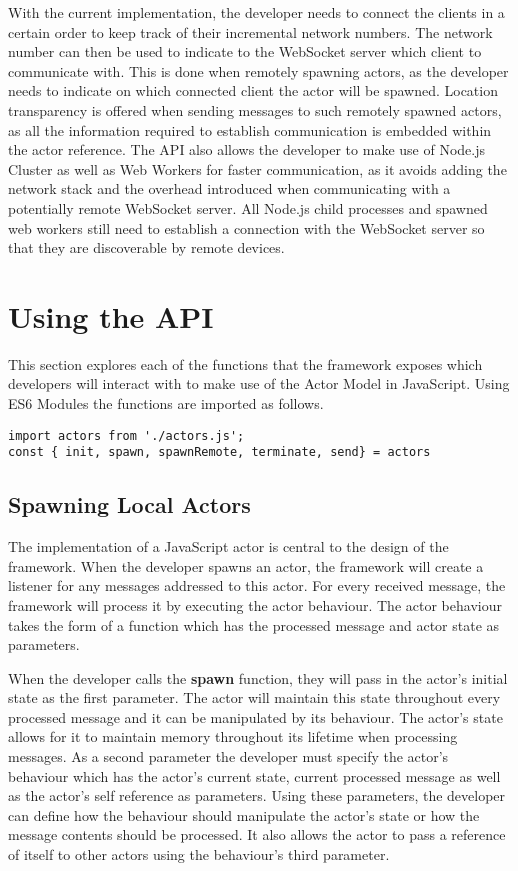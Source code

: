 \documentclass[12pt, a4paper]{report}
\theoremstyle{definition}
\theoremstyle{definition}%
\theoremstyle{definition}%
\theoremstyle{definition}%
\theoremstyle{definition}%
\theoremstyle{definition}%
\begin{document}
With the current implementation, the developer needs to connect the clients in a certain order to keep track of their incremental network numbers. The network number can then be used to indicate to the WebSocket server which client to communicate with. This is done when remotely spawning actors, as the developer needs to indicate on which connected client the actor will be spawned. Location transparency is offered when sending messages to such remotely spawned actors, as all the information required to establish communication is embedded within the actor reference. The API also allows the developer to make use of Node.js Cluster as well as Web Workers for faster communication, as it avoids adding the network stack and the overhead introduced when communicating with a potentially remote WebSocket server. All Node.js child processes and spawned web workers still need to establish a connection with the WebSocket server so that they are discoverable by remote devices.
\section{Using the API}
This section explores each of the functions that the framework exposes which developers will interact with to make use of the Actor Model in JavaScript. Using ES6 Modules the functions are imported as follows.
\begin{lstlisting}
import actors from './actors.js';
const { init, spawn, spawnRemote, terminate, send} = actors
\end{lstlisting}
\subsection{Spawning Local Actors}
The implementation of a JavaScript actor is central to the design of the framework. When the developer spawns an actor, the framework will create a listener for any messages addressed to this actor. For every received message, the framework will process it by executing the actor behaviour. The actor behaviour takes the form of a function which has the processed message and actor state as parameters.

When the developer calls the \textbf{spawn} function, they will pass in the actor's initial state as the first parameter. The actor will maintain this state throughout every processed message and it can be manipulated by its behaviour. The actor's state allows for it to maintain memory throughout its lifetime when processing messages. As a second parameter the developer must specify the actor's behaviour which has the actor's current state, current processed message as well as the actor's self reference as parameters. Using these parameters, the developer can define how the behaviour should manipulate the actor's state or how the message contents should be processed. It also allows the actor to pass a reference of itself to other actors using the behaviour's third parameter.
\end{document}
